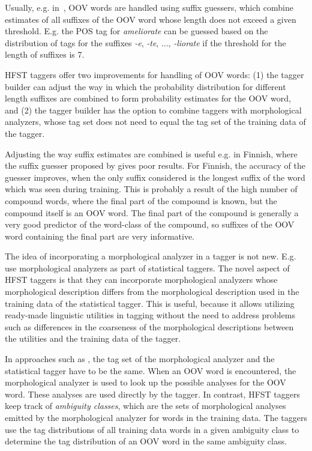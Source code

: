 \documentclass{llncs}
\begin{document}
Usually, e.g. in~\cite{Brants:2000}, OOV words are handled using
suffix guessers, which combine estimates of all suffixes of the OOV
word whose length does not exceed a given threshold. E.g. the POS tag
for {\it ameliorate} can be guessed based on the distribution of tags
for the suffixes {\it -e}, {\it -te}, ..., {\it -liorate} if the
threshold for the length of suffixes is 7.

HFST taggers offer two improvements for handling of OOV words: (1) the
tagger builder can adjust the way in which the probability
distribution for different length suffixes are combined to form
probability estimates for the OOV word, and (2) the tagger builder has
the option to combine taggers with morphological analyzers, whose tag
set does not need to equal the tag set of the training data of
the tagger.

Adjusting the way suffix estimates are combined is useful e.g. in
Finnish, where the suffix guesser proposed by \cite{Brants:2000} gives
poor results. For Finnish, the accuracy of the guesser improves, when
the only suffix considered is the longest suffix of the word which was
seen during training. This is probably a result of the high number of
compound words, where the final part of the compound is known, but the
compound itself is an OOV word. The final part of the compound is
generally a very good predictor of the word-class of the compound, so
suffixes of the OOV word containing the final part are very
informative.

The idea of incorporating a morphological analyzer in a tagger is not
new. E.g.  \cite{Tzoukerman:1996,Oravecz:2002} use morphological
analyzers as part of statistical taggers. The novel aspect of HFST
taggers is that they can incorporate morphological analyzers whose
morphological description differs from the morphological description
used in the training data of the statistical tagger. This is useful,
because it allows utilizing ready-made linguistic utilities in tagging
without the need to address problems such as differences in the
coarseness of the morphological descriptions between the utilities and
the training data of the tagger.

In approaches such as \cite{Tzoukerman:1996,Oravecz:2002}, the tag set
of the morphological analyzer and the statistical tagger have to be
the same. When an OOV word is encountered, the morphological analyzer
is used to look up the possible analyses for the OOV word. These
analyses are used directly by the tagger. In contrast, HFST taggers
keep track of {\it ambiguity classes}, which are the sets of
morphological analyses emitted by the morphological analyzer for words
in the training data. The taggers use the tag distributions of all
training data words in a given ambiguity class to determine the tag
distribution of an OOV word in the same ambiguity class.
\end{document}
